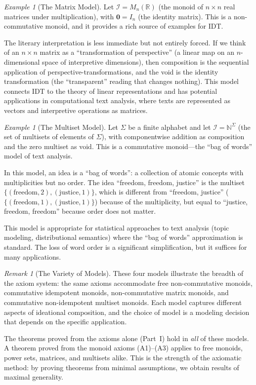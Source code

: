 \documentclass[11pt,openany]{book}
\theoremstyle{definition}
\theoremstyle{plain}
\theoremstyle{remark}
\newtheorem{remark}[axiom]{Remark}
\newtheorem{example}[axiom]{Example}
\newcommand{\IS}{\mathcal{I}}               %
\newcommand{\void}{\mathbf{0}}              %
\begin{document}
\begin{example}[The Matrix Model]
Let $\IS = M_n(\mathbb{R})$ (the monoid of $n \times n$ real matrices under multiplication), with $\void = I_n$ (the identity matrix). This is a non-commutative monoid, and it provides a rich source of examples for IDT.

The literary interpretation is less immediate but not entirely forced. If we think of an $n \times n$ matrix as a ``transformation of perspective'' (a linear map on an $n$-dimensional space of interpretive dimensions), then composition is the sequential application of perspective-transformations, and the void is the identity transformation (the ``transparent'' reading that changes nothing). This model connects IDT to the theory of linear representations and has potential applications in computational text analysis, where texts are represented as vectors and interpretive operations as matrices.
\end{example}

\begin{example}[The Multiset Model]
Let $\Sigma$ be a finite alphabet and let $\IS = \mathbb{N}^\Sigma$ (the set of multisets of elements of $\Sigma$), with componentwise addition as composition and the zero multiset as void. This is a commutative monoid---the ``bag of words'' model of text analysis.

In this model, an idea is a ``bag of words'': a collection of atomic concepts with multiplicities but no order. The idea ``freedom, freedom, justice'' is the multiset $\{(\text{freedom}, 2), (\text{justice}, 1)\}$, which is different from ``freedom, justice'' ($\{(\text{freedom}, 1), (\text{justice}, 1)\}$) because of the multiplicity, but equal to ``justice, freedom, freedom'' because order does not matter.

This model is appropriate for statistical approaches to text analysis (topic modeling, distributional semantics) where the ``bag of words'' approximation is standard. The loss of word order is a significant simplification, but it suffices for many applications.
\end{example}

\begin{remark}[The Variety of Models]
These four models illustrate the breadth of the axiom system: the same axioms accommodate free non-commutative monoids, commutative idempotent monoids, non-commutative matrix monoids, and commutative non-idempotent multiset monoids. Each model captures different aspects of ideational composition, and the choice of model is a modeling decision that depends on the specific application.

The theorems proved from the axioms alone (Part~I) hold in \emph{all} of these models. A theorem proved from the monoid axioms (A1)--(A3) applies to free monoids, power sets, matrices, and multisets alike. This is the strength of the axiomatic method: by proving theorems from minimal assumptions, we obtain results of maximal generality.
\end{remark}
\end{document}
